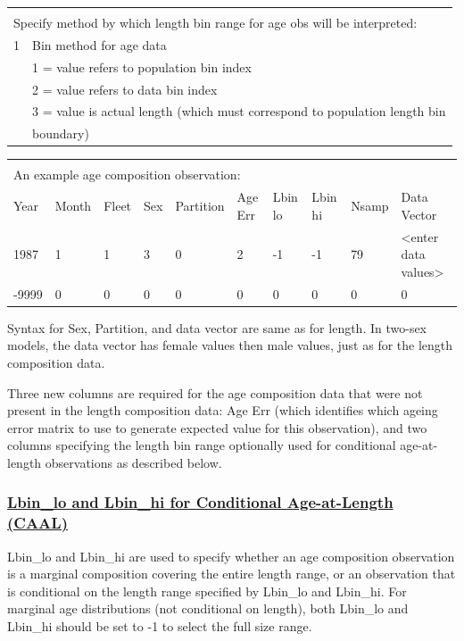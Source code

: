 \begin{tabular}{p{1cm} p{14cm}}
	 & \\
	\multicolumn{2}{l}{Specify method by which length bin range for age obs will be interpreted:} \\
	\hline
	1 & Bin method for age data \Tstrut\\
	  & 1 = value refers to population bin index \\
	  & 2 = value refers to data bin index \\
	  & 3 = value is actual length (which must correspond to population length bin \\
	  & boundary) \Bstrut\\
	 \hline
\end{tabular}

\begin{tabular}{p{1cm} p{1cm} p{1cm} p{1cm} p{1.5cm} p{1cm} p{1cm} p{1cm} p{1cm} p{2.5cm}}
	\multicolumn{10}{l}{} \\
	\multicolumn{10}{l}{An example age composition observation:} \\
	\hline
	Year & Month & Fleet & Sex & Partition & Age Err & Lbin lo & Lbin hi & Nsamp & Data Vector \Tstrut\\
	\hline
	1987 & 1 & 1 & 3 & 0 & 2 & -1 & -1 & 79 & <enter data values> \Tstrut\\
	-9999 & 0 & 0 & 0 & 0 & 0 & 0 & 0 & 0 & 0 \Bstrut\\
	\hline
\end{tabular}

Syntax for Sex, Partition, and data vector are same as for length. In two-sex models, the data vector has female values then male values, just as for the length composition data.

Three new columns are required for the age composition data that were not present in the length composition data: Age Err (which identifies which ageing error matrix to use to generate expected value for this observation), and two columns specifying the length bin range optionally used for conditional age-at-length observations as described below.


\hypertarget{CondAatL}{}
\subsubsection[Lbin\_lo and Lbin\_hi for Conditional Age-at-Length (CAAL)]{\protect\hyperlink{CondAatL}{Lbin\_lo and Lbin\_hi for Conditional Age-at-Length (CAAL)}}
Lbin\_lo and Lbin\_hi are used to specify whether an age composition observation is a marginal composition covering the entire length range, or an observation that is conditional on the length range specified by Lbin\_lo and Lbin\_hi. For marginal age distributions (not conditional on length), both Lbin\_lo and Lbin\_hi should be set to -1 to select the full size range.

